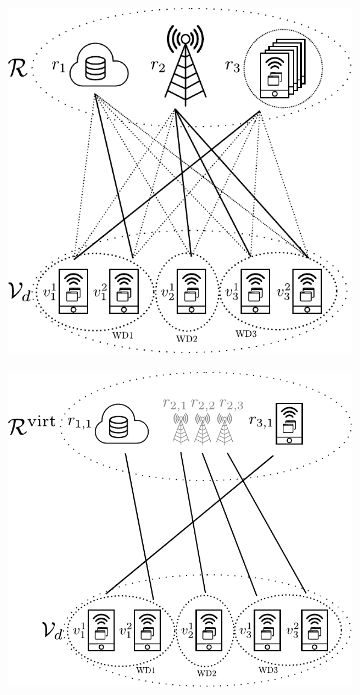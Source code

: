 \documentclass[12pt,draftclsnofoot,onecolumn]{IEEEtran}
\begin{document}
\begin{figure}[ht]
	\centering
	\begin{subfigure}{.21\textwidth}
		\centering
		\includegraphics[height=\linewidth]{matching1.pdf}
		\caption{}
		\label{fig:4a}
	\end{subfigure}\hspace{8mm}
	\begin{subfigure}{.21\textwidth}
		\centering
		\includegraphics[height=\linewidth]{matching2.pdf}
		\caption{}
		\label{fig:4b}
	\end{subfigure}
	

\end{figure}
\end{document}
